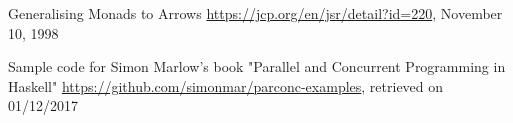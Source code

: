 \begin{thebibliography}{100}
	
	 Generalising Monads to Arrows
	\url{https://jcp.org/en/jsr/detail?id=220}, November 10, 1998
	
	 Sample code for Simon Marlow's book "Parallel and Concurrent Programming in Haskell"
	\url{https://github.com/simonmar/parconc-examples}, retrieved on 01/12/2017
\end{thebibliography}